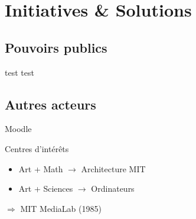 \section{Initiatives \& Solutions}

\subsection{Pouvoirs publics}

\begin{frame}{test}
test
\end{frame}

\subsection{Autres acteurs}

\begin{frame}{Moodle}
\end{frame}

\begin{frame}
   \pause
   \begin{block}{Centres d'intérêts}
     \begin{itemize}
       \item Art + Math $\rightarrow$ Architecture MIT
       \item Art + Sciences $\rightarrow$ Ordinateurs
     \end{itemize}
     $\Rightarrow$ MIT MediaLab (1985)
   \end{block}
\end{frame}

